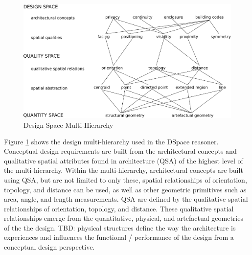 \documentclass[12pt]{ucthesis}
\begin{document}
\begin{figure}[H]
\centering
\includegraphics[width=140mm]{hierarchy2}
\caption{Design Space Multi-Hierarchy}
\label{hierarchy}
\end{figure}

Figure \ref{hierarchy} shows the design multi-hierarchy used in the DSpace reasoner. Conceptual design requirements are built from the architectural concepts and qualitative spatial attributes found in architecture (QSA) of the highest level of the multi-hierarchy. Within the multi-hierarchy, architectural concepts are built using QSA, but are not limited to only these, spatial relationships of orientation, topology, and distance can be used, as well as other geometric primitives such as area, angle, and length measurements. QSA are defined by the qualitative spatial relationships of orientation, topology, and distance. These qualitative spatial relationships emerge from the quantitative, physical, and artefactual geometries of the the design. TBD: physical structures define the way the architecture is experiences and influences the functional / performance of the design from a conceptual design perspective.
\end{document}

